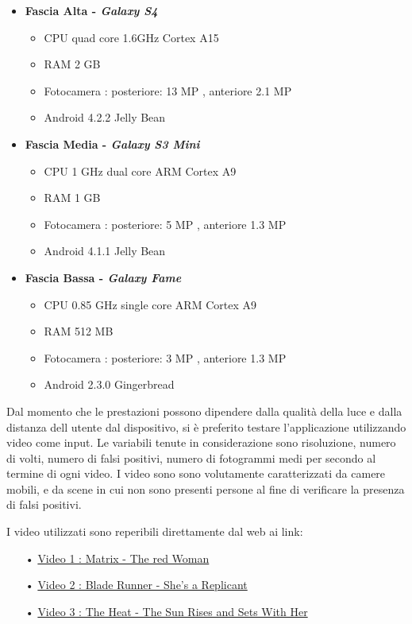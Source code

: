 \begin{itemize}
\item \textbf{Fascia Alta - \textit{Galaxy S4}} 
	\begin{itemize}
		\item CPU quad core 1.6GHz Cortex A15 
		\item RAM 2 GB 
		\item Fotocamera : posteriore: 13 MP , anteriore 2.1 MP
		\item Android 4.2.2 Jelly Bean 
	\end{itemize}
\item \textbf{Fascia Media - \textit{Galaxy S3 Mini}}
	\begin{itemize}
		\item CPU 1 GHz dual core ARM Cortex A9
		\item RAM 1 GB 
		\item Fotocamera : posteriore: 5 MP , anteriore 1.3 MP
		\item Android 4.1.1 Jelly Bean 
	\end{itemize}
\item \textbf{Fascia Bassa - \textit{Galaxy Fame}}
	\begin{itemize}
		\item CPU 0.85 GHz single core ARM Cortex A9
		\item RAM 512 MB
		\item Fotocamera : posteriore: 3 MP , anteriore 1.3 MP
		\item Android 2.3.0 Gingerbread
	\end{itemize}
\end{itemize}

Dal momento che le prestazioni possono dipendere dalla qualità della luce e dalla distanza dell utente dal dispositivo, si è preferito testare l'applicazione utilizzando video come input. Le variabili tenute in considerazione sono risoluzione, numero di volti, numero di falsi positivi, numero di fotogrammi medi per secondo al termine di ogni video. I video sono sono volutamente caratterizzati da camere mobili, e da scene in cui non sono presenti persone al fine di verificare la presenza di falsi positivi.

I video utilizzati sono reperibili direttamente dal web ai link:

\begin{itemize}
\item[•] \href{http://www.youtube.com/watch?v=XFTbN10f_Fg}{Video 1 : Matrix - The red Woman}
\item[•] \href{http://www.youtube.com/watch?v=yWPyRSURYFQ}{Video 2 : Blade Runner - She's a Replicant}
\item[•] \href{http://www.youtube.com/watch?v=s3rv0BdxWfM}{Video 3 : The Heat - The Sun Rises and Sets With Her }
\end{itemize}


